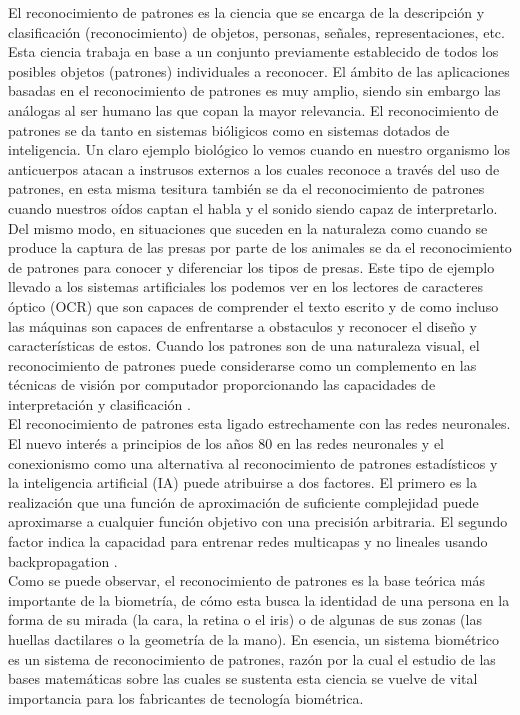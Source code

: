 El reconocimiento de patrones es la ciencia que se encarga de la descripción y clasificación (reconocimiento) de objetos, personas, señales, representaciones, etc. Esta ciencia trabaja en base a un conjunto previamente establecido de todos los posibles objetos (patrones) individuales a reconocer. El ámbito de las aplicaciones basadas en el reconocimiento de patrones es muy amplio, siendo sin embargo las análogas al ser humano las que copan la mayor relevancia. El reconocimiento de patrones se da tanto en sistemas bióligicos como en sistemas dotados de inteligencia. Un claro ejemplo biológico lo vemos cuando en nuestro organismo los anticuerpos atacan a instrusos externos a los cuales reconoce a través del uso de patrones, en esta misma tesitura también se da el reconocimiento de patrones cuando nuestros oídos captan el habla y el sonido siendo capaz de interpretarlo. Del mismo modo, en situaciones que suceden en la naturaleza como cuando se produce la captura de las presas por parte de los animales se da el reconocimiento de patrones para conocer y diferenciar los tipos de presas. Este tipo de ejemplo llevado a los sistemas artificiales los podemos ver en los lectores de caracteres óptico (OCR) que son capaces de comprender el texto escrito y de como incluso las máquinas son capaces de enfrentarse a obstaculos y reconocer el diseño y características de estos. Cuando los patrones son de una naturaleza visual, el reconocimiento de patrones puede considerarse como un complemento en las técnicas de visión por computador proporcionando las capacidades de interpretación y clasificación \cite{Reference8}. \\

El reconocimiento de patrones esta ligado estrechamente con las redes neuronales. El nuevo interés a principios de los años 80 en las redes neuronales y el conexionismo como una alternativa al reconocimiento de patrones estadísticos y la inteligencia artificial (IA) puede atribuirse a dos factores. El primero es la realización que una función de aproximación de suficiente complejidad puede aproximarse a cualquier función objetivo con una precisión arbitraria. El segundo factor indica la capacidad para entrenar redes multicapas y no lineales usando backpropagation \cite{Reference8}. \\

Como se puede observar, el reconocimiento de patrones es la base teórica más importante de la biometría, de cómo esta busca la identidad de una persona en la forma de su mirada (la cara, la retina o el iris) o de algunas de sus zonas (las huellas dactilares o la geometría de la mano). En esencia, un sistema biométrico es un sistema de reconocimiento de patrones, razón por la cual el estudio de las bases matemáticas sobre las cuales se sustenta esta ciencia se vuelve de vital importancia para los fabricantes de tecnología biométrica. \\


